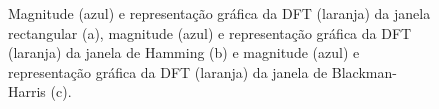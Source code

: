 \documentclass[11pt]{article}
\numberwithin{equation}{section}
\begin{document}
\begin{figure}[H]
	\centering
	\linebreak
	\linebreak
	\vspace{-0.8em}
	\caption{Magnitude (azul) e representação gráfica da DFT (laranja) da janela rectangular (a), magnitude (azul) e representação gráfica da DFT (laranja) da janela de Hamming (b) e  magnitude (azul) e representação gráfica da DFT (laranja) da janela de Blackman-Harris (c).}
	\vspace{-0.8em}
\end{figure}
\end{document}
